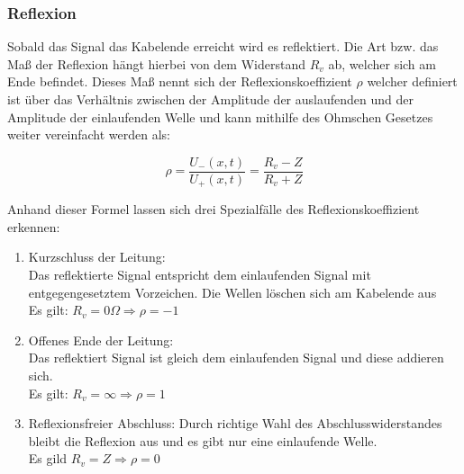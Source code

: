 \documentclass[a4paper,10pt,twocolumn]{scrartcl} %
\begin{document}
		\subsubsection{Reflexion} \label{Reflexion}

			Sobald das Signal das Kabelende erreicht wird es reflektiert. Die Art bzw. das Maß
			der Reflexion hängt hierbei von dem Widerstand $R_v$ ab, welcher sich am Ende befindet.
			Dieses Maß nennt sich der Reflexionskoeffizient $\rho$ welcher definiert ist über 
			das Verhältnis zwischen der Amplitude der auslaufenden und der Amplitude der einlaufenden 
			Welle und kann mithilfe des Ohmschen Gesetzes weiter vereinfacht werden als:

			\begin{displaymath}
				\rho = \frac{U_{-}(x,t)}{U_{+}(x,t)} = \frac{R_v - Z}{R_v + Z}
			\end{displaymath}

			\noindent Anhand dieser Formel lassen sich drei Spezialfälle des Reflexionskoeffizient erkennen:

			\begin{enumerate}
				\item Kurzschluss der Leitung: \\
						Das reflektierte Signal entspricht dem einlaufenden Signal mit entgegengesetztem
						Vorzeichen. Die Wellen löschen sich am Kabelende aus\\
						Es gilt: $R_v = 0 \Omega \Rightarrow \rho = -1 $
				\item Offenes Ende der Leitung: \\
						Das reflektiert Signal ist gleich dem einlaufenden Signal und diese 
						addieren sich. \\
						Es gilt: $R_v = \infty \Rightarrow \rho = 1 $
				\item Reflexionsfreier Abschluss:
						Durch richtige Wahl des Abschlusswiderstandes bleibt die Reflexion aus und 
						es gibt nur eine einlaufende Welle. \\
						Es gild $R_v = Z \Rightarrow \rho = 0 $
			\end{enumerate}
\end{document}
